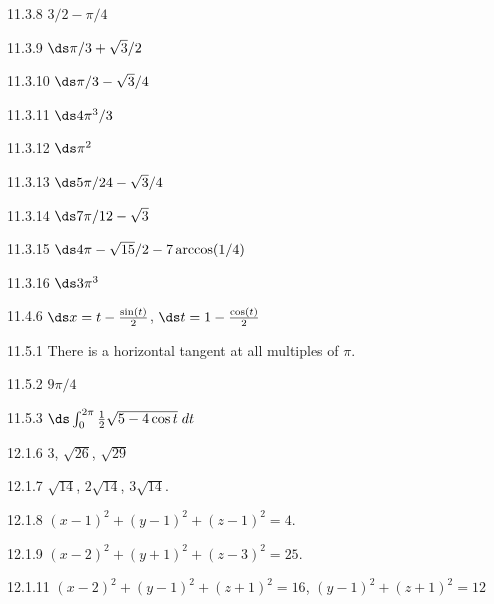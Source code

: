 \begin{Answer}{11.3.8}
 $3/2-\pi/4$
\end{Answer}
\begin{Answer}{11.3.9}
 $\ds \pi/3+\sqrt3/2$
\end{Answer}
\begin{Answer}{11.3.10}
 $\ds \pi/3-\sqrt3/4$
\end{Answer}
\begin{Answer}{11.3.11}
 $\ds 4\pi^3/3$
\end{Answer}
\begin{Answer}{11.3.12}
 $\ds \pi^2$
\end{Answer}
\begin{Answer}{11.3.13}
 $\ds 5\pi/24-\sqrt3/4$
\end{Answer}
\begin{Answer}{11.3.14}
 $\ds 7\pi/12-\sqrt3$
\end{Answer}
\begin{Answer}{11.3.15}
 $\ds 4\pi-\sqrt{15}/2-7\arccos(1/4)$
\end{Answer}
\begin{Answer}{11.3.16}
 $\ds 3\pi^3$
\end{Answer}
\begin{Answer}{11.4.6}
 $\ds x=t-{\sin(t)\over2}$, $\ds t=1-{\cos(t)\over2}$
\end{Answer}
\begin{Answer}{11.5.1}
 There is a horizontal tangent at all multiples of $\pi$.
\end{Answer}
\begin{Answer}{11.5.2}
 $9\pi/4$
\end{Answer}
\begin{Answer}{11.5.3}
 $\ds \int_0^{2\pi}{1\over2} \sqrt{5-4\cos t}\;dt$
\end{Answer}
\begin{Answer}{12.1.6}
$3$, $\sqrt{26}$, $\sqrt{29}$
\end{Answer}
\begin{Answer}{12.1.7}
$\sqrt{14}$, $2\sqrt{14}$, $3\sqrt{14}$.
\end{Answer}
\begin{Answer}{12.1.8}
$(x-1)^2+(y-1)^2+(z-1)^2=4$.
\end{Answer}
\begin{Answer}{12.1.9}
$(x-2)^2+(y+1)^2+(z-3)^2=25$.
\end{Answer}
\begin{Answer}{12.1.11}
$(x-2)^2+(y-1)^2+(z+1)^2=16$,
$(y-1)^2+(z+1)^2=12$
\end{Answer}
